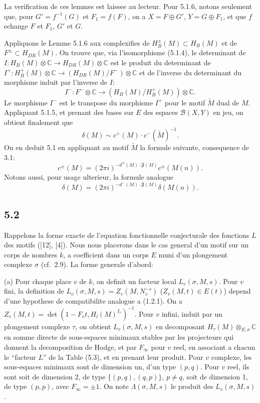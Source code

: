 \documentclass[12pt,a4paper]{article}
\theoremstyle{plain}
\theoremstyle{definition}
\theoremstyle{remark}
\newcommand{\C}{\mathbb{C}}
\begin{document}
La verification de ces lemmes est laissee au lecteur. Pour 5.1.6, notons seulement
que, pour $G' = f^{-1}(G)$ et $F_1 = f(F)$, on a $X = F \oplus G'$, $Y = G \oplus F_1$, et que $f$
echange $F$ et $F_1$, $G'$ et $G$.

Appliquons le Lemme 5.1.6 aux complexifies de $H^\pm_B(M) \subset H_B(M)$ et de
$F^\pm \subset H_{DR}(M)$. On trouve que, via l'isomorphisme (5.1.4), le determinant de
$I: H_B(M) \otimes \C \to H_{DR}(M) \otimes \C$ est le produit du determinant de
$I^+: H^+_B(M) \otimes \C \to (H_{DR}(M)/F^-) \otimes \C$ et de l'inverse du determinant du morphisme
induit par l'inverse de $I$:
\[
I^-: F^- \otimes \C \to (H_B(M)/H^+_B(M)) \otimes \C.
\]
Le morphisme $I^-$ est le transpose du morphisme $I^+$ pour le motif $\check{M}$ dual de $M$.
Appliquant 5.1.5, et prenant des bases sur $E$ des espaces $\mathcal{B}(X, Y)$ en jeu, on obtient
finalement que
\begin{equation}\label{eq:5.1.7}
\delta(M) \sim c^+(M) \cdot c^-({\check{M}})^{-1}.
\end{equation}
On en deduit 5.1 en appliquant au motif $\check{M}$ la formule suivante, consequence
de 3.1:
\begin{equation}\label{eq:5.1.8}
c^\pm(M) = (2\pi i)^{-d^\mp(M) \cdot \mathfrak{F}(M)} c^\pm(M(n)).
\end{equation}
Notons aussi, pour usage ulterieur, la formule analogue
\begin{equation}\label{eq:5.1.9}
\delta(M) = (2\pi i)^{-d^-(M) \cdot \mathfrak{F}(M)} \delta(M(n)).
\end{equation}

\subsection*{5.2}

Rappelons la forme exacte de l'equation fonctionnelle conjecturale des fonctions
$L$ des motifs ([12], [4]). Nous nous placerons dans le cas general d'un motif sur un
corps de nombres $k$, a coefficient dans un corps $E$ muni d'un plongement complexe
$\sigma$ (cf.~2.9). La forme generale d'abord:

(a) Pour chaque place $v$ de $k$, on definit un facteur local $L_v(\sigma, M, s)$. Pour $v$ fini,
la definition de $L_v(\sigma, M, s) = Z_v(M, N_v^{-s})$ ($Z_v(M, t) \in E(t)$) depend d'une hypothese
de compatibilite analogue a (1.2.1). On a $Z_v(M, t) = \det(1 - F_v t, H_l(M)^{I_v})^{-1}$.
Pour $v$ infini, induit par un plongement complexe $\tau$, on obtient $L_v(\sigma, M, s)$ en
decomposant $H_\tau(M) \otimes_{E,\sigma} \C$ en somme directe de sous-espaces minimaux stables par
les projecteurs qui donnent la decomposition de Hodge, et par $F_\infty$ pour $v$ reel, en
associant a chacun le ``facteur $L$'' de la Table (5.3), et en prenant leur produit. Pour
$v$ complexe, les sous-espaces minimaux sont de dimension un, d'un type $(p, q)$.
Pour $v$ reel, ils sont soit de dimension 2, de type $\{(p,q), (q,p)\}$, $p \neq q$, soit de
dimension 1, de type $(p,p)$, avec $F_\infty = \pm 1$. On note $\Lambda(\sigma, M, s)$ le produit des
$L_v(\sigma, M, s)$.
\end{document}
